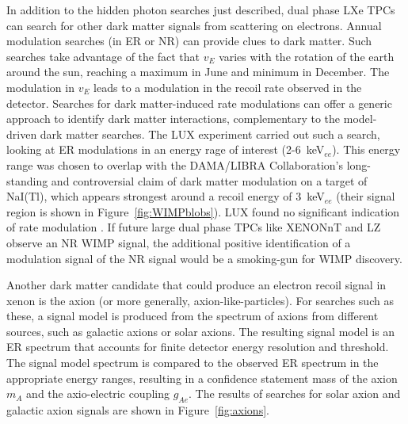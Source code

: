 In addition to the hidden photon searches just described, dual phase \ac{LXe} \ac{TPC}s can search for other dark matter signals from scattering on electrons. Annual modulation searches (in \ac{ER} or \ac{NR}) can provide clues to dark matter. Such searches take advantage of the fact that $v_{E}$ varies with the rotation of the earth around the sun, reaching a maximum in June and minimum in December. The modulation in $v_{E}$ leads to a modulation in the recoil rate observed in the detector. Searches for dark matter-induced rate modulations can offer a generic approach to identify dark matter interactions, complementary to the model-driven dark matter searches. The \ac{LUX} experiment carried out such a search, looking at \ac{ER} modulations in an energy rage of interest (2-6~keV$_{ee}$). This energy range was chosen to overlap with the DAMA/LIBRA Collaboration's long-standing and controversial claim of dark matter modulation on a target of NaI(Tl), which appears strongest around a recoil energy of 3~keV$_{ee}$ (their signal region is shown in Figure~\ref{fig:WIMPblobs}). \ac{LUX} found no significant indication of rate modulation \cite{LUXModulation}. If future large dual phase \ac{TPC}s like XENONnT and \ac{LZ} observe an \ac{NR} \ac{WIMP} signal, the additional positive identification of a modulation signal of the \ac{NR} signal would be a smoking-gun for \ac{WIMP} discovery. 

Another dark matter candidate that could produce an electron recoil signal in xenon is the axion (or more generally, axion-like-particles). For searches such as these, a signal model is produced from the spectrum of axions from different sources, such as galactic axions or solar axions. The resulting signal model is an \ac{ER} spectrum that accounts for finite detector energy resolution and threshold. The signal model spectrum is compared to the observed \ac{ER} spectrum in the appropriate energy ranges, resulting in a confidence statement mass of the axion $m_{A}$ and the axio-electric coupling $g_{Ae}$. The results of searches for solar axion and galactic axion signals are shown in Figure~\ref{fig:axions}.

